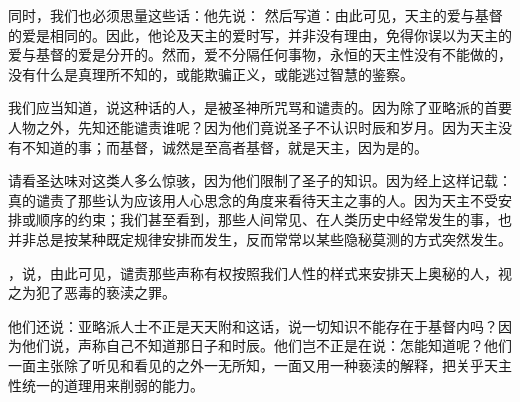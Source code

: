 同时，我们也必须思量这些话：他先说： 然后写道：由此可见，天主的爱与基督的爱是相同的。因此，他论及天主的爱时写，并非没有理由，免得你误以为天主的爱与基督的爱是分开的。然而，爱不分隔任何事物，永恒的天主性没有不能做的，没有什么是真理所不知的，或能欺骗正义，或能逃过智慧的鉴察。\par

\par

我们应当知道，说这种话的人，是被圣神所咒骂和谴责的。因为除了亚略派的首要人物之外，先知还能谴责谁呢？因为他们竟说圣子不认识时辰和岁月。因为天主没有不知道的事；而基督，诚然是至高者基督，就是天主，因为是的。\par

请看圣达味对这类人多么惊骇，因为他们限制了圣子的知识。因为经上这样记载：真的谴责了那些认为应该用人心思念的角度来看待天主之事的人。因为天主不受安排或顺序的约束；我们甚至看到，那些人间常见、在人类历史中经常发生的事，也并非总是按某种既定规律安排而发生，反而常常以某些隐秘莫测的方式突然发生。\par

，说，由此可见，谴责那些声称有权按照我们人性的样式来安排天上奥秘的人，视之为犯了恶毒的亵渎之罪。\par

他们还说：亚略派人士不正是天天附和这话，说一切知识不能存在于基督内吗？因为他们说，声称自己不知道那日子和时辰。他们岂不正是在说：怎能知道呢？他们一面主张除了听见和看见的之外一无所知，一面又用一种亵渎的解释，把关乎天主性统一的道理用来削弱的能力。\par

